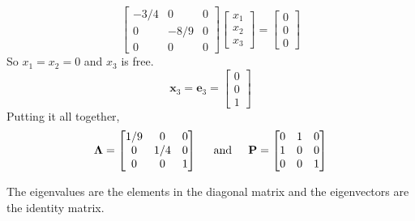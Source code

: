 \begin{enumerate}[label=(\alph*)]
\[\begin{bmatrix}
                    -3/4 & 0 & 0\\
                    0 & -8/9 & 0\\
                    0 & 0 & 0
                \end{bmatrix}
                \begin{bmatrix}
                    x_1 \\
                    x_2 \\
                    x_3
                \end{bmatrix}
                =
                \begin{bmatrix}
                    0 \\
                    0 \\
                    0
                \end{bmatrix}
            \]
            So $x_1 = x_2 = 0$ and $x_3$ is free.
            \[
                \mathbf{x}_3
                =
                \mathbf{e}_3
                =
                \begin{bmatrix}
                    0 \\
                    0 \\
                    1
                \end{bmatrix}
            \]
            Putting it all together,
            \[
                \mathbf{\Lambda}
                =
                \begin{bmatrix}
                    1/9 & 0 & 0 \\
                    0 & 1/4 & 0 \\
                    0 & 0 & 1
                \end{bmatrix}
                \hspace{0.2in}\text{and}\hspace{0.2in}
                \mathbf{P}
                =
                \begin{bmatrix}
                    0 & 1 & 0 \\
                    1 & 0 & 0 \\
                    0 & 0 & 1
                \end{bmatrix}
            \]
            \par
            The eigenvalues are the elements in the diagonal matrix and the eigenvectors are the identity matrix.
        \end{enumerate}